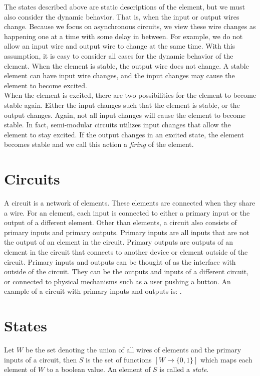 \documentclass[12pt]{report}
\begin{document}
The states described above are static descriptions of the element, but we must also consider the dynamic behavior.  
That is, when the input or output wires change.  Because we focus on asynchronous circuits, we view these wire changes as happening one at a time with some delay in between.  For example, we do not allow an input wire and output wire to change at the same time.  With this assumption, it is easy to consider all cases for the dynamic behavior of the element.  When the element is stable, the output wire does not change.  A stable element can have input wire changes, and the input changes may cause the element to become excited.  \\

When the element is excited, there are two possibilities for the element to become stable again.  Either the input changes such that the element is stable, or the output changes.  Again, not all input changes will cause the element to become stable.  In fact, semi-modular circuits utilizes input changes that allow the element to stay excited.  If the output changes in an excited state, the element becomes stable and we call this action a {\em firing} of the element.

\section{Circuits}
A circuit is a network of elements.  These elements are connected when they share a wire.  For an element, each input is connected to either a primary input or the output of a different element.  Other than elements, a circuit also consists of primary inputs and primary outputs.  Primary inputs are all inputs that are not the output of an element in the circuit.  Primary outputs are outputs of an element in the circuit that connects to another device or element outside of the circuit.  Primary inputs and outputs can be thought of as the interface with outside of the circuit.  They can be the outputs and inputs of a different circuit, or connected to physical mechanisms such as a user pushing a button.   An example of a circuit with primary inputs and outputs is:  .
    
\section{States}
Let $W$ be the set denoting the union of all wires of elements and the primary inputs of a circuit, then $S$ is the set of functions $[W\to \{0,1\}]$ which maps each element of $W$ to a boolean value.  An element of $S$ is called a {\em state}.  
\end{document}

